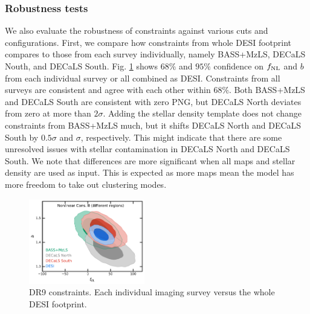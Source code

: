 \subsubsection{Robustness tests}
We also evaluate the robustness of constraints against various cuts and configurations. First, we compare how constraints from whole DESI footprint compares to those from each survey individually, namely BASS+MzLS, DECaLS Nouth, and DECaLS South. Fig. \ref{fig:mcmc_dr9reg} shows $68\%$ and $95\%$ confidence on $f_{\rm NL}$ and $b$ from each individual survey or all combined as DESI. Constraints from all surveys are consistent and agree with each other within $68\%$. Both BASS+MzLS and DECaLS South are consistent with zero PNG, but DECaLS North deviates from zero at more than $2\sigma$. Adding the stellar density template does not change constraints from BASS+MzLS much, but it shifts DECaLS North and DECaLS South by $0.5\sigma$ and $\sigma$, respectively. This might indicate that there are some unresolved issues with stellar contamination in DECaLS North and DECaLS South. We note that differences are more significant when all maps and stellar density are used as input. This is expected as more maps mean the model has more freedom to take out clustering modes.
 
\begin{figure}
    \centering
    \includegraphics[width=0.45\textwidth]{figures/mcmc_dr9regions.pdf} 
    \caption{DR9 constraints. Each individual imaging survey versus the whole DESI footprint.}\label{fig:mcmc_dr9reg}
\end{figure}

